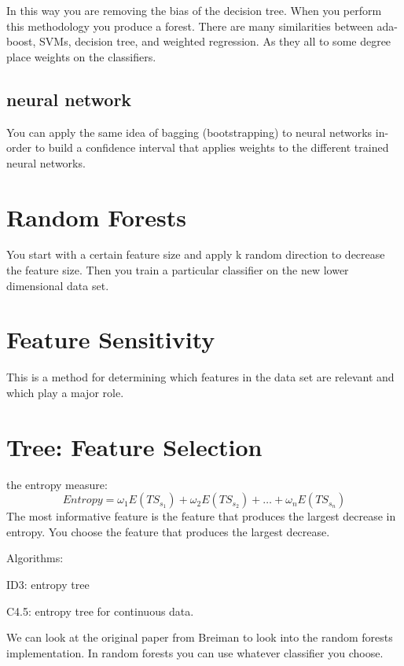 \documentclass[letterpaper, 9pt]{article}
\begin{document}
In this way you are removing the bias of the decision tree. When you perform this methodology you produce a forest. There are many similarities between ada-boost, SVMs, decision tree, and weighted regression. As they all to some degree place weights on the classifiers.

\subsection{neural network}
You can apply the same idea of bagging (bootstrapping) to neural networks in-order to build a confidence interval that applies weights to the different trained neural networks.

\section{Random Forests}
You start with a certain feature size and apply k random direction to decrease the feature size. Then you train a particular classifier on the new lower dimensional data set.

\section{Feature Sensitivity}
This is a method for determining which features in the data set are relevant and which play a major role.


\section{Tree: Feature Selection}

the entropy measure:
\begin{equation}
Entropy = \omega_1 E(TS_{s_1}) + \omega_2 E(TS_{s_2}) + \dots + \omega_n E(TS_{s_n})
\end{equation}
The most informative feature is the feature that produces the largest decrease in entropy. You choose the feature that produces the largest decrease.

Algorithms:
\begin{itmeize}
\item ID3: entropy tree
\item C4.5: entropy tree for continuous data.
\end{itmeize}

We can look at the original paper from Breiman to look into the random forests implementation. In random forests you can use whatever classifier you choose.
\end{document}
